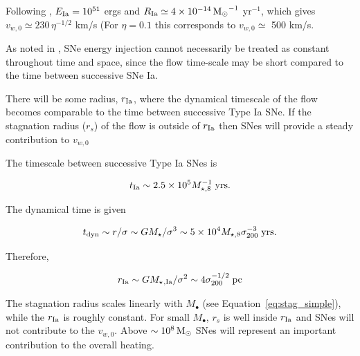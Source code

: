 \documentclass[usenatbib,fleqn]{mn2e}
\newcommand\gsim{\mathrel{\rlap{\lower4pt\hbox{\hskip1pt$\sim$}}
        \raise1pt\hbox{$>$}}}
\newcommand{\rs}{r_s}
\newcommand{\Mstar}{M_{\star}}
\newcommand{\Mseight}{M_{\star,8}}
\newcommand{\Mbh}[1][]{M_{\bullet#1}}
\newcommand{\rIa}{r_{\rm Ia}}
\newcommand{\vwO}{v_{w,0}}
\begin{document}
\begin{enumerate}
 Following \citealt{ShcherbakovWong+:2014a}, $E_{\rm Ia}=10^{51}$ ergs and $R_{\rm Ia}\simeq 4 \times 10^{-14} \,{\rm M_\odot}^{-1}$ yr$^{-1}$, which gives $\vwO\simeq 230 \, \eta^{-1/2}$ km/s (For $\eta=0.1$ this corresponds to $\vwO\simeq$ 500 km/s.   

As noted in \citealt{ShcherbakovWong+:2014a}, SNe energy injection cannot necessarily be treated as constant throughout  time and space, since the flow time-scale may be short compared to the time between successive SNe Ia.

There will be some radius, $\rIa$, where the dynamical timescale of the flow becomes comparable to the time between successive Type Ia SNe.  If the stagnation radius ($\rs$) of the flow is outside of $\rIa$ then SNes will provide a steady contribution to $\vwO$

The timescale between successive Type Ia SNes  is

\begin{align}
t_{\rm Ia} \sim 2.5 \times 10^5 \Mseight^{-1} \; {\rm yrs}.
\end{align}

The dynamical time is given

\begin{align}
 t_{\rm dyn} \sim r/\sigma \sim G \Mstar/\sigma^3 \sim 5 \times 10^4 \Mseight \sigma_{200}^{-3} \; {\rm yrs}.
\end{align}

Therefore,

\begin{align}
 r_{\rm Ia} \sim G \Mstar{}_{,\rm Ia}/\sigma^2 \sim 4 \sigma_{200}^{-1/2} \; {\rm pc}
\end{align}

The stagnation radius scales linearly with $\Mbh$ (see Equation~\ref{eq:stag_simple}), while the $\rIa$ is roughly constant. For small $\Mbh$, $\rs$ is well inside $\rIa$ and SNes will not contribute to the $\vwO$.  Above $\sim10^8 \,{\rm M_\odot}$ SNes will represent an important contribution to the overall heating. 


\end{enumerate}
\end{document}
